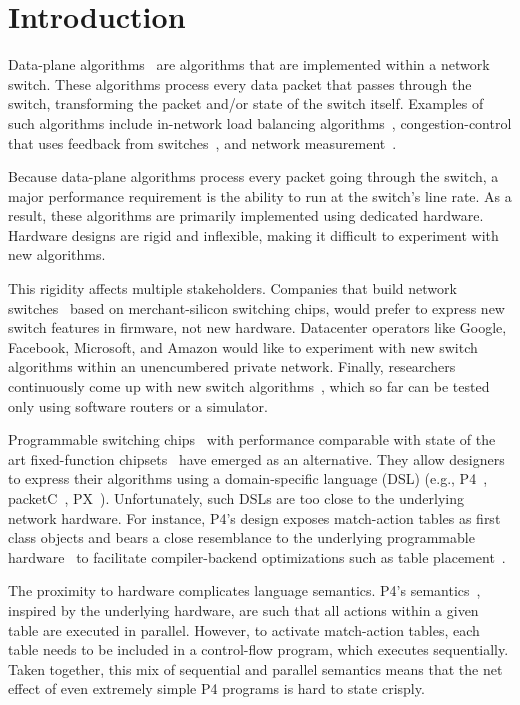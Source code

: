 \section{Introduction}
\label{s:intro}

Data-plane algorithms~\cite{cestan} are algorithms that are implemented within
a network switch. These algorithms process every data packet that passes
through the switch, transforming the packet and/or state of the switch itself.
Examples of such algorithms include in-network load balancing
algorithms~\cite{conga, ecmp}, congestion-control that uses feedback from
switches~\cite{xcp, rcp, pdq, dctcp}, and network measurement~\cite{opensketch,
bitmap_george, elephant_george}.

Because data-plane algorithms process every packet going through the switch, a
major performance requirement is the ability to run at the switch's line rate.
As a result, these algorithms are primarily implemented using dedicated
hardware. Hardware designs are rigid and inflexible, making it difficult to
experiment with new algorithms.

This rigidity affects multiple stakeholders. Companies that build network
switches~\cite{cisco_nexus, dell_force10, arista_7050} based on
merchant-silicon switching chips, would prefer to express new switch features
in firmware, not new hardware.  Datacenter operators like Google, Facebook,
Microsoft, and Amazon would like to experiment with new switch algorithms
within an unencumbered private network.  Finally, researchers continuously come
up with new switch algorithms~\cite{xcp, codel, d3, detail, pdq}, which so far
can be tested only using software routers or a simulator.

Programmable switching chips~\cite{flexpipe, xpliant, rmt} with performance
comparable with state of the art fixed-function chipsets~\cite{trident,
tomahawk, mellanox} have emerged as an alternative.  They allow designers to
express their algorithms using a domain-specific language (DSL) (e.g.,
P4~\cite{p4}, packetC~\cite{packetc}, PX~\cite{px}).  Unfortunately, such DSLs
are too close to the underlying network hardware.  For instance, P4's design
exposes match-action tables as first class objects and bears a close
resemblance to the underlying programmable hardware~\cite{flexpipe, rmt} to
facilitate compiler-backend optimizations such as table
placement~\cite{lavanya_compiler}.

The proximity to hardware complicates language semantics. P4's
semantics~\cite{p4spec}, inspired by the underlying hardware, are such that all
actions within a given table are executed in parallel. However, to activate
match-action tables, each table needs to be included in a control-flow program,
which executes sequentially.  Taken together, this mix of sequential and
parallel semantics means that the net effect of even extremely simple P4
programs is hard to state crisply.

